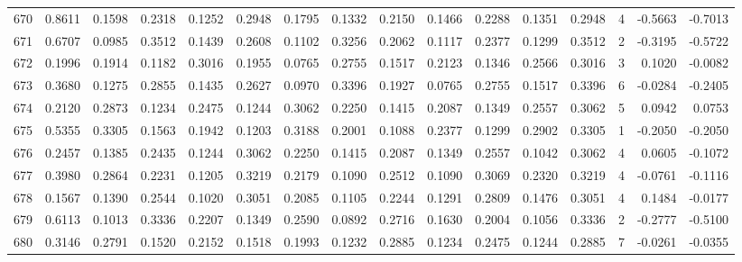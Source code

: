 \begin{tabular}{lrrrrrrrrrrrrrrr}
670 &      0.8611 &  0.1598 &  0.2318 &  0.1252 &  0.2948 &  0.1795 &  0.1332 &  0.2150 &  0.1466 &  0.2288 &   0.1351 &     0.2948 &      4 &                   -0.5663 &                    -0.7013 \\
671 &      0.6707 &  0.0985 &  0.3512 &  0.1439 &  0.2608 &  0.1102 &  0.3256 &  0.2062 &  0.1117 &  0.2377 &   0.1299 &     0.3512 &      2 &                   -0.3195 &                    -0.5722 \\
672 &      0.1996 &  0.1914 &  0.1182 &  0.3016 &  0.1955 &  0.0765 &  0.2755 &  0.1517 &  0.2123 &  0.1346 &   0.2566 &     0.3016 &      3 &                    0.1020 &                    -0.0082 \\
673 &      0.3680 &  0.1275 &  0.2855 &  0.1435 &  0.2627 &  0.0970 &  0.3396 &  0.1927 &  0.0765 &  0.2755 &   0.1517 &     0.3396 &      6 &                   -0.0284 &                    -0.2405 \\
674 &      0.2120 &  0.2873 &  0.1234 &  0.2475 &  0.1244 &  0.3062 &  0.2250 &  0.1415 &  0.2087 &  0.1349 &   0.2557 &     0.3062 &      5 &                    0.0942 &                     0.0753 \\
675 &      0.5355 &  0.3305 &  0.1563 &  0.1942 &  0.1203 &  0.3188 &  0.2001 &  0.1088 &  0.2377 &  0.1299 &   0.2902 &     0.3305 &      1 &                   -0.2050 &                    -0.2050 \\
676 &      0.2457 &  0.1385 &  0.2435 &  0.1244 &  0.3062 &  0.2250 &  0.1415 &  0.2087 &  0.1349 &  0.2557 &   0.1042 &     0.3062 &      4 &                    0.0605 &                    -0.1072 \\
677 &      0.3980 &  0.2864 &  0.2231 &  0.1205 &  0.3219 &  0.2179 &  0.1090 &  0.2512 &  0.1090 &  0.3069 &   0.2320 &     0.3219 &      4 &                   -0.0761 &                    -0.1116 \\
678 &      0.1567 &  0.1390 &  0.2544 &  0.1020 &  0.3051 &  0.2085 &  0.1105 &  0.2244 &  0.1291 &  0.2809 &   0.1476 &     0.3051 &      4 &                    0.1484 &                    -0.0177 \\
679 &      0.6113 &  0.1013 &  0.3336 &  0.2207 &  0.1349 &  0.2590 &  0.0892 &  0.2716 &  0.1630 &  0.2004 &   0.1056 &     0.3336 &      2 &                   -0.2777 &                    -0.5100 \\
680 &      0.3146 &  0.2791 &  0.1520 &  0.2152 &  0.1518 &  0.1993 &  0.1232 &  0.2885 &  0.1234 &  0.2475 &   0.1244 &     0.2885 &      7 &                   -0.0261 &                    -0.0355 \\

\end{tabular}
